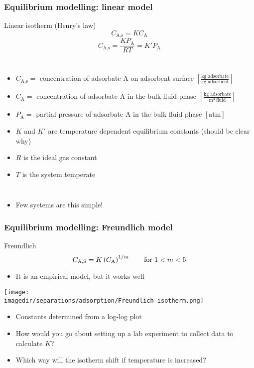\begin{frame}\frametitle{Equilibrium modelling: linear model}
	\begin{exampleblock}{Linear isotherm (Henry's law)}
		\[C_\text{A,s} = K C_\text{A}\]
		\[C_\text{A,s} = \frac{K P_\text{A}}{RT} = K' P_\text{A}\]
	\end{exampleblock}
	\begin{columns}[t]
			\begin{itemize}
				\item	{\small $C_\text{A,s} =$ concentration of adsorbate A on adsorbent surface \hfill $\left[\displaystyle \frac{\text{kg adsorbate}}{\text{kg adsorbent}}\right]$}
				\item	{\small $C_\text{A} =$ concentration of adsorbate A in the bulk fluid phase \hfill $\left[\displaystyle \frac{\text{kg adsorbate}}{\text{m}^3~ \text{fluid}}\right]$}
				\item	{\small $P_\text{A} =$ partial pressure of adsorbate A in the bulk fluid phase \hfill $\left[ \text{atm}\right]\,$}
				\item	{\small $K$ and $K'$ are temperature dependent equilibrium constants {\tiny (should be clear why)}}
				\item	{\small $R$ is the ideal gas constant}
				\item	{\small $T$ is the system temperate}
			\end{itemize}
	\end{columns}
	\vspace{12pt}
	\begin{itemize}
		\item	Few systems are this simple!
	\end{itemize}
\end{frame}

\begin{frame}\frametitle{Equilibrium modelling: Freundlich model}
	\begin{exampleblock}{Freundlich}
		\[C_\text{A,S} = K \left(C_\text{A}\right)^{1/m}\qquad \text{for $ 1 < m < 5$}\] 
	\end{exampleblock}

	\vspace{12pt}
	\begin{itemize}
		\item	It is an empirical model, but it works well
	\end{itemize}
	\begin{center}
		\texttt{[image: \\imagedir/separations/adsorption/Freundlich-isotherm.png]}
	\end{center}
	
	\begin{itemize}
		\item	Constants determined from a log-log plot
		\item	How would you go about setting up a lab experiment to collect data to calculate $K$?
		\item	Which way will the isotherm shift if temperature is increased?
	\end{itemize}
\end{frame}


